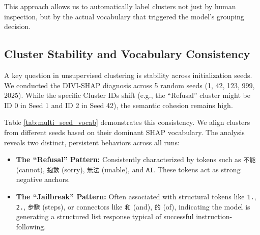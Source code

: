 \documentclass[conference]{IEEEtran}
\begin{document}
This approach allows us to automatically label clusters not just by human inspection, but by the actual vocabulary that triggered the model's grouping decision.

\subsection{Cluster Stability and Vocabulary Consistency}
A key question in unsupervised clustering is stability across initialization seeds. We conducted the DIVI-SHAP diagnosis across 5 random seeds (1, 42, 123, 999, 2025). While the specific Cluster IDs shift (e.g., the ``Refusal'' cluster might be ID 0 in Seed 1 and ID 2 in Seed 42), the semantic cohesion remains high.

Table \ref{tab:multi_seed_vocab} demonstrates this consistency. We align clusters from different seeds based on their dominant SHAP vocabulary. The analysis reveals two distinct, persistent behaviors across all runs:
\begin{itemize}
    \item \textbf{The ``Refusal'' Pattern:} Consistently characterized by tokens such as \texttt{不能} (cannot), \texttt{抱歉} (sorry), \texttt{無法} (unable), and \texttt{AI}. These tokens act as strong negative anchors.
    \item \textbf{The ``Jailbreak'' Pattern:} Often associated with structural tokens like \texttt{1.}, \texttt{2.}, \texttt{步驟} (steps), or connectors like \texttt{和} (and), \texttt{的} (of), indicating the model is generating a structured list response typical of successful instruction-following.
\end{itemize}
\end{document}
